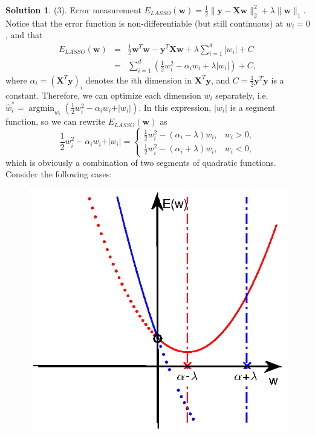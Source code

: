 \documentclass[a4paper,UTF8]{article}
\numberwithin{equation}{section}
\theoremstyle{definition}
\newtheorem*{solution}{Solution}
\begin{document}
\begin{solution}
\item[(3).] Error measurement $E_{LASSO}(\bm{w})=\frac{1}{2}\lVert \mathbf{y} - \mathbf X \mathbf{w} \rVert_2^2 +\lambda\lVert \mathbf{w}\rVert_1$. Notice that the error function is non-differentiable (but still continuous) at $w_i=0$, and that 
\begin{eqnarray}
E_{LASSO}(\bm{w})&=&\frac{1}{2}\bm{w}^T\bm{w} - \bm{y}^T\bm{Xw}+\lambda\sum_{i=1}^d \vert w_i\vert+C \nonumber\\
&=&\sum_{i=1}^d\left( \frac{1}{2}w_i^2- \alpha_iw_i+ \lambda\vert w_i\vert\right)+C,
\end{eqnarray}
where $\alpha_i=(\bm{X}^T\bm{y})_i$ denotes the $i$th dimension in $\bm{X}^T\bm{y}$, and $C=\frac{1}{2}\bm{y}^T\bm{y}$ is a constant. Therefore, we can optimize each dimension $w_i$ separately, i.e. $\hat{w}_i^*=\mathop{\arg\min}_{w_i}\left(\frac{1}{2}w_i^2- \alpha_iw_i+ \vert w_i\vert\right)$. In this expression, $\vert w_i\vert$ is a segment function, so we can rewrite $E_{LASSO}(\bm{w})$ as
\begin{equation}
\frac{1}{2}w_i^2- \alpha_iw_i+ \vert w_i\vert=\left\{ 
\begin{array}{ll}
\frac{1}{2}w_i^2- (\alpha_i-\lambda)w_i, & w_i>0, \\
\frac{1}{2}w_i^2- (\alpha_i+\lambda)w_i, & w_i<0,
\end{array}\right.
\end{equation}
which is obviously a combination of two segments of quadratic functions. Consider the following cases:
\begin{figure}[h!]
\begin{minipage}[t]{0.3\linewidth}
     \centering
     \includegraphics[width=1\textwidth]{figure/4-3(1)new.eps}

\end{minipage}
\end{figure}
\end{solution}
\end{document}
